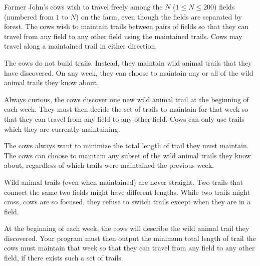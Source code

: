 Farmer John's cows wish to travel freely among the $N$ ($1 \le N \le 200$) fields (numbered from $1$ to $N$) on the farm, even though the fields are separated by forest. The cows wish to maintain trails between pairs of fields so that they can travel from any field to any other field using the maintained trails. Cows may travel along a maintained trail in either direction.

The cows do not build trails. Instead, they maintain wild animal trails that they have discovered. On any week, they can choose to maintain any or all of the wild animal trails they know about.

Always curious, the cows discover one new wild animal trail at the beginning of each week. They must then decide the set of trails to maintain for that week so that they can travel from any field to any other field. Cows can only use trails which they are currently maintaining.

The cows always want to minimize the total length of trail they must maintain. The cows can choose to maintain any subset of the wild animal trails they know about,  regardless of which trails were maintained the previous week.

Wild animal trails (even when maintained) are never straight. Two trails that connect the same two fields might have different lengths. While two trails might cross, cows are so focused, they refuse to switch trails except when they are in a field. 

At the beginning of each week, the cows will describe the wild animal trail they discovered. Your program must then output the minimum total length of trail the cows must maintain that week so that they can travel from any field to any other field, if there exists such a set of trails. 
